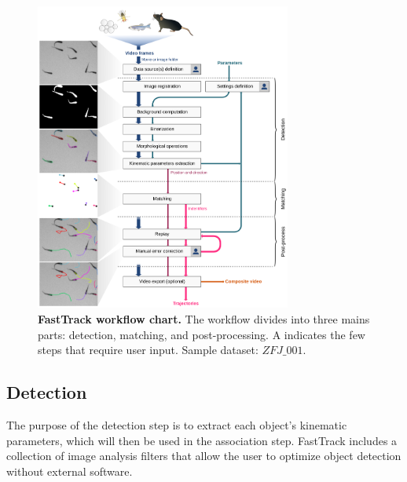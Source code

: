     \begin{figure}[h!]
    \centering
    \includegraphics[width=0.75\textwidth]{part_1/assets/Figure_1.png}
    \caption{{\bf FastTrack workflow chart.} The workflow divides into three mains parts: detection, matching, and post-processing. A \faUser indicates the few steps that require user input. Sample dataset: $ZFJ\_001$.}
    \label{part_1:fig_1}
    \end{figure}

        \subsection{Detection}
        The purpose of the detection step is to extract each object's kinematic parameters, which will then be used in the association step. FastTrack includes a collection of image analysis filters that allow the user to optimize object detection without external software.
